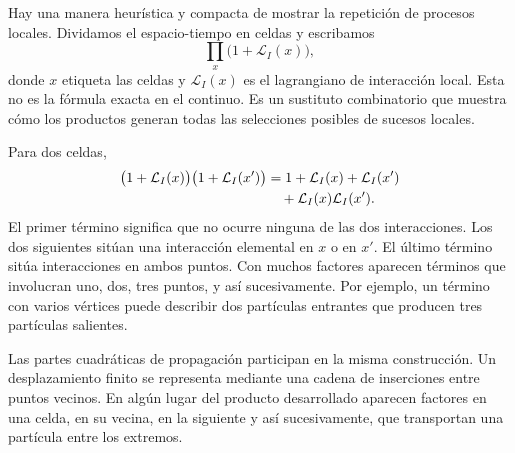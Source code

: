 Hay una manera heurística y compacta de mostrar la repetición de procesos locales. Dividamos el espacio-tiempo en celdas y escribamos
\begin{equation}
\prod_x\bigl(1+\mathcal L_I(x)\bigr),
\end{equation}
donde \(x\) etiqueta las celdas y \(\mathcal L_I(x)\) es el lagrangiano de interacción local. Esta no es la fórmula exacta en el continuo. Es un sustituto combinatorio que muestra cómo los productos generan todas las selecciones posibles de sucesos locales.

\begin{classroomqa}
\end{classroomqa}

Para dos celdas,
\begin{align}
\bigl(1+\mathcal L_I(x)\bigr)
\bigl(1+\mathcal L_I(x')\bigr)
&=
1+\mathcal L_I(x)+\mathcal L_I(x')
\notag\\
&\quad{}+\mathcal L_I(x)\mathcal L_I(x').
\end{align}
El primer término significa que no ocurre ninguna de las dos interacciones. Los dos siguientes sitúan una interacción elemental en \(x\) o en \(x'\). El último término sitúa interacciones en ambos puntos. Con muchos factores aparecen términos que involucran uno, dos, tres puntos, y así sucesivamente. Por ejemplo, un término con varios vértices puede describir dos partículas entrantes que producen tres partículas salientes.

Las partes cuadráticas de propagación participan en la misma construcción. Un desplazamiento finito se representa mediante una cadena de inserciones entre puntos vecinos. En algún lugar del producto desarrollado aparecen factores en una celda, en su vecina, en la siguiente y así sucesivamente, que transportan una partícula entre los extremos.

\begin{classroomqa}
\end{classroomqa}


